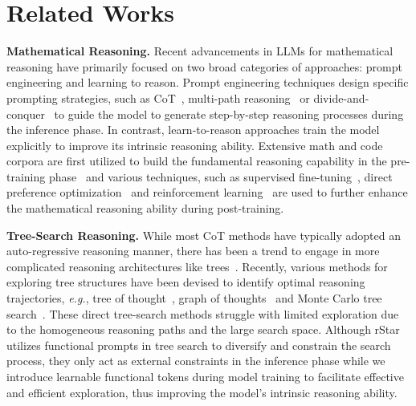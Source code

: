 \section{Related Works}
\textbf{Mathematical Reasoning.}
Recent advancements in LLMs for mathematical reasoning have primarily focused on two broad categories of approaches: prompt engineering and learning to reason. Prompt engineering techniques design specific prompting strategies, such as CoT~\citep{wei2022chain,kojima2022large,wang2022self,zhang2022automatic}, multi-path reasoning~\citep{yao2023tot,yao2022react,besta2024graph} or divide-and-conquer~\citep{zhou2022least,sel2023algorithm,wang2023plan} to guide the model to generate step-by-step reasoning processes during the inference phase. In contrast, learn-to-reason approaches train the model explicitly to improve its intrinsic reasoning ability. Extensive math and code corpora are first utilized to build the fundamental reasoning capability in the pre-training phase~\citep{lewkowycz2022solving,shao2024deepseekmath,yang2024qwen2,abdin2024phi,dubey2024llama} and various techniques, such as supervised fine-tuning~\citep{yuan2023scaling,wang2023mathcoder,min2024imitateexploreselfimprovereproduction}, direct preference optimization~\citep{rafailov2024direct,lai2024step} and reinforcement learning~\citep{reft2024,shao2024deepseekmath,guo2025deepseek} are used to further enhance the mathematical reasoning ability during post-training.


\textbf{Tree-Search Reasoning.}
While most CoT methods have typically adopted an auto-regressive reasoning manner, there has been a trend to engage in more complicated reasoning architectures like trees~\citep{koh2024tree,zhang2024llamaberrypairwiseoptimizationo1like}. Recently, various methods for exploring tree structures have been devised to identify optimal reasoning trajectories, \textit{e.g.},  tree of thought~\citep{yao2023tot}, graph of thoughts~\citep{besta2024graph} and Monte Carlo tree search~\citep{hao2023reasoninglanguagemodelplanning,chen2024alphamath,zhang2024rest}. These direct tree-search methods struggle with limited exploration due to the homogeneous reasoning paths and the large search space. Although rStar~\citep{qi2024mutualreasoningmakessmaller} utilizes functional prompts in tree search to diversify and constrain the search process, they only act as external constraints in the inference phase while we introduce learnable functional tokens during model training to facilitate effective and efficient exploration, thus improving the model's intrinsic reasoning ability.

